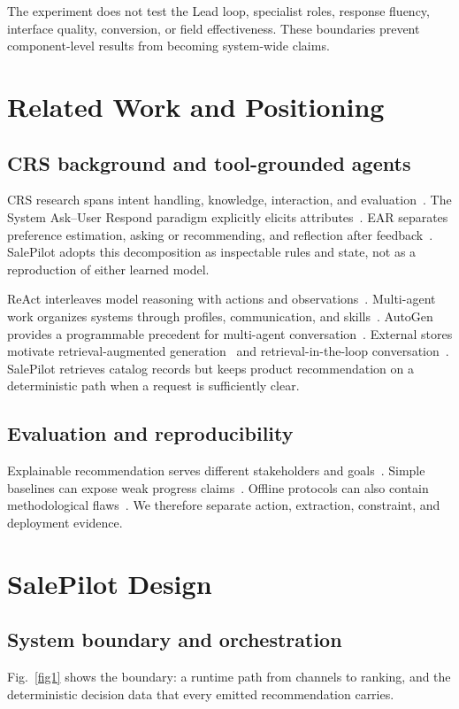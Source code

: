 \documentclass[conference,a4paper]{IEEEtran}
\begin{document}
The experiment does not test the Lead loop, specialist roles, response fluency, interface quality, conversion, or field effectiveness. These boundaries prevent component-level results from becoming system-wide claims.

\section{Related Work and Positioning}
\subsection{CRS background and tool-grounded agents}
CRS research spans intent handling, knowledge, interaction, and evaluation~\cite{jannach2021survey}. The System Ask--User Respond paradigm explicitly elicits attributes~\cite{zhang2018systemask}. EAR separates preference estimation, asking or recommending, and reflection after feedback~\cite{lei2020ear}. SalePilot adopts this decomposition as inspectable rules and state, not as a reproduction of either learned model.

ReAct interleaves model reasoning with actions and observations~\cite{yao2023react}. Multi-agent work organizes systems through profiles, communication, and skills~\cite{guo2024multiagents}. AutoGen provides a programmable precedent for multi-agent conversation~\cite{wu2024autogen}. External stores motivate retrieval-augmented generation~\cite{lewis2020rag} and retrieval-in-the-loop conversation~\cite{shuster2021retrieval}. SalePilot retrieves catalog records but keeps product recommendation on a deterministic path when a request is sufficiently clear.

\subsection{Evaluation and reproducibility}
Explainable recommendation serves different stakeholders and goals~\cite{zhang2020explainable}. Simple baselines can expose weak progress claims~\cite{ferraridacrema2021troubling}. Offline protocols can also contain methodological flaws~\cite{hidasi2023widespread}. We therefore separate action, extraction, constraint, and deployment evidence.

\section{SalePilot Design}
\subsection{System boundary and orchestration}
Fig.~\ref{fig1} shows the boundary: a runtime path from channels to ranking, and the deterministic decision data that every emitted recommendation carries.
\end{document}
